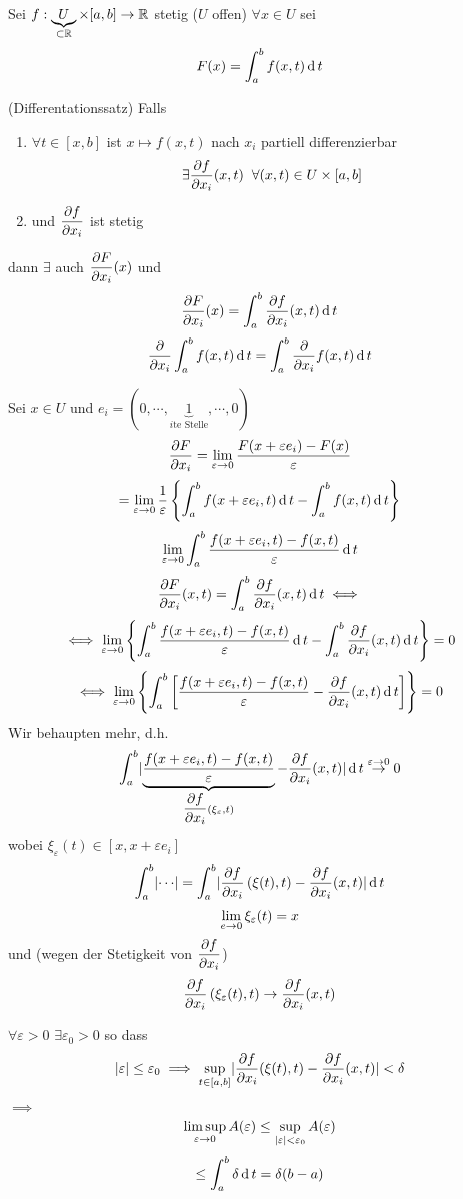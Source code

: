 Sei $f:\underbrace{U}_{\subset \mathbb{R}}\times [a,b]\rightarrow\mathbb{R}$ stetig ($U$ offen) $\forall x\in U$ sei
\[F(x)=\int_a^bf(x,t)\operatorname{d} t\]
\begin{Sat}
  (Differentationssatz) Falls
  \begin{enumerate}
    \item $\forall t\in \left[ x,b \right]$ ist $x\mapsto f(x,t)$ nach $x_i$ partiell differenzierbar
      \[\exists\dfrac{\partial f}{\partial x_i}(x,t)\hspace{2mm}\forall (x,t)\in U\times \left[ a,b \right]\]
    \item und $\dfrac{\partial f}{\partial x_i}$ ist stetig
  \end{enumerate}
  dann $\exists$ auch $\dfrac{\partial F}{\partial x_i}(x)$ und
  \[\dfrac{\partial F}{\partial x_i}(x)=\int_a^b\dfrac{\partial f}{\partial x_i}(x,t)\operatorname{d} t\]
  \[\dfrac{\partial }{\partial x_i}\int_a^bf(x,t)\operatorname{d} t=\int_a^b\dfrac{\partial }{\partial x_i}f(x,t)\operatorname{d} t\]
\end{Sat}
\begin{Bew}
  Sei $x\in U$ und $e_i=(0,\cdots,\underbrace{1}_{i\text{te Stelle}},\cdots,0)$
  \[\dfrac{\partial F}{\partial x_i}=\displaystyle\lim_{\varepsilon\rightarrow0}\frac{F(x+\varepsilon e_i)-F(x)}{\varepsilon}\]
  \[=\displaystyle\lim_{\varepsilon\rightarrow0}\frac{1}{\varepsilon}\left\{ \int_a^bf(x+\varepsilon e_i ,t)\operatorname{d} t-\int_a^bf(x,t)\operatorname{d} t \right\}\]
  \[\displaystyle\lim_{\varepsilon\rightarrow0}\int_a^b\frac{f(x+\varepsilon e_i,t)-f(x,t)}{\varepsilon}\operatorname{d} t\]
  \[\dfrac{\partial F}{\partial x_i}(x,t)=\int_a^b\dfrac{\partial f}{\partial x_i}(x,t)\operatorname{d} t\iff\]
  \[\iff \displaystyle\lim_{\varepsilon\rightarrow0}\left\{ \int_a^b\frac{f(x+\varepsilon e_i,t)-f(x,t)}{\varepsilon}\operatorname{d} t-\int_a^b\dfrac{\partial f}{\partial x_i}(x,t)\operatorname{d} t \right\}=0\]
  \[\iff \displaystyle\lim_{\varepsilon\rightarrow0}\left\{ \int_a^b\left[ \frac{f(x+\varepsilon e_i,t)-f(x,t)}{\varepsilon}-\dfrac{\partial f}{\partial x_i}(x,t)\operatorname{d} t \right] \right\}=0\]
  Wir behaupten mehr, d.h.
  \[\int_a^b\mathopen|  \underbrace{\frac{f(x+\varepsilon e_i,t)-f(x,t)}{\varepsilon}}_{\dfrac{\partial f}{\partial x_i}(\xi_\varepsilon,t)}-\dfrac{\partial f}{\partial x_i}(x,t) \mathclose|\operatorname{d} t\stackrel{\varepsilon\rightarrow 0}{\rightarrow}0\]
  wobei $\xi_\varepsilon(t)\in \left[ x,x+\varepsilon e_i \right]$
  \[\int_a^b\mathopen| \cdots \mathclose|=\int_a^b\mathopen| \dfrac{\partial f}{\partial x_i}\left( \xi(t),t \right)-\dfrac{\partial f}{\partial x_i}(x,t) \mathclose|\operatorname{d} t\]
  \[\displaystyle\lim_{e\rightarrow0}\xi_\varepsilon(t)=x\]
  und (wegen der Stetigkeit von $\dfrac{\partial f}{\partial x_i}$)
  \[\dfrac{\partial f}{\partial x_i}\left( \xi_\varepsilon(t),t \right)\rightarrow \dfrac{\partial f}{\partial x_i}(x,t)\]
  \begin{Beh}
    $\forall \varepsilon>0$ $\exists \varepsilon_0>0$ so dass
    \[\mathopen| \varepsilon \mathclose|\leq \varepsilon_0\implies \sup_{t\in [a,b]}\mathopen| \dfrac{\partial f}{\partial x_i}(\xi(t),t)-\dfrac{\partial f}{\partial x_i}(x,t) \mathclose|<\delta\]
  \end{Beh}
  $\implies$
  \[\limsup_{\varepsilon\rightarrow 0} A(\varepsilon)\leq \sup_{\mathopen| \varepsilon \mathclose|<\varepsilon_0}A(\varepsilon)\]
  \[\leq \int_a^b\delta\operatorname{d} t=\delta(b-a)\]

\end{Bew}
